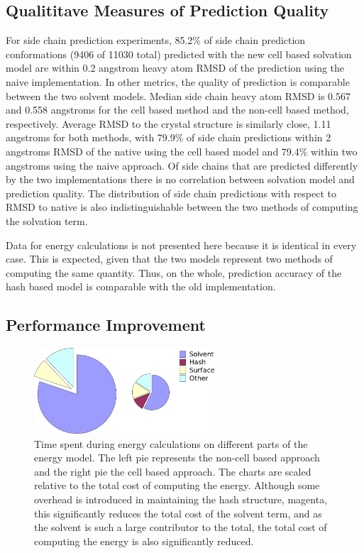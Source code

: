 \subsection{Qualititave Measures of Prediction Quality}
\label{subsec:results_quality}

For side chain prediction experiments, 85.2\% of side chain prediction conformations (9406 of 11030 total) predicted with the new cell based solvation model are within 0.2 angstrom heavy atom RMSD of the prediction using the naive implementation.
In other metrics, the quality of prediction is comparable between the two solvent models. 
Median side chain heavy atom RMSD is 0.567 and 0.558 angstroms for the cell based method and the non-cell based method, respectively.
Average RMSD to the crystal structure is similarly close, 1.11 angstroms for both methods, with 79.9\% of side chain predictions within 2 angstroms RMSD of the native using the cell based model and 79.4\% within two angstroms using the naive approach.
Of side chains that are predicted differently by the two implementations there is no correlation between solvation model and prediction quality.
The distribution of side chain predictions with respect to RMSD to native is also indistinguishable between the two methods of computing the solvation term.

Data for energy calculations is not presented here because it is identical in every case.
This is expected, given that the two models represent two methods of computing the same quantity.
Thus, on the whole, prediction accuracy of the hash based model is comparable with the old implementation.

\subsection{Performance Improvement}
\label{subsec:performance_improvement}

\begin{figure}[h]
\centering
\includegraphics[width=0.6\textwidth]{figures/side_by_side.png}
\caption{Time spent during energy calculations on different parts of the energy model.
The left pie represents the non-cell based approach and the right pie the cell based approach.
The charts are scaled relative to the total cost of computing the energy.
Although some overhead is introduced in maintaining the hash structure, magenta, this significantly reduces the total cost of the solvent term, and as the solvent is such a large contributor to the total, the total cost of computing the energy is also significantly reduced.}
\label{figure:timing_pie}
\end{figure}

